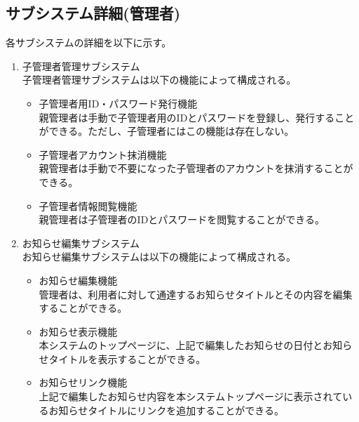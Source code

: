 \documentclass[a4j]{jarticle}
\begin{document}
\subsection{サブシステム詳細(管理者)}
各サブシステムの詳細を以下に示す。
\begin{enumerate}

  \item 子管理者管理サブシステム\\
  子管理者管理サブシステムは以下の機能によって構成される。
  \begin{itemize}
    \item 子管理者用ID・パスワード発行機能\\
    親管理者は手動で子管理者用のIDとパスワードを登録し、発行することができる。ただし、子管理者にはこの機能は存在しない。
    \item 子管理者アカウント抹消機能\\
    親管理者は手動で不要になった子管理者のアカウントを抹消することができる。
    \item 子管理者情報閲覧機能\\
    親管理者は子管理者のIDとパスワードを閲覧することができる。
  \end{itemize}


  \item お知らせ編集サブシステム\\
  お知らせ編集サブシステムは以下の機能によって構成される。
  \begin{itemize}
    \item お知らせ編集機能\\
    管理者は、利用者に対して通達するお知らせタイトルとその内容を編集することができる。
    \item お知らせ表示機能\\
    本システムのトップページに、上記で編集したお知らせの日付とお知らせタイトルを表示することができる。
    \item お知らせリンク機能\\
    上記で編集したお知らせ内容を本システムトップページに表示されているお知らせタイトルにリンクを追加することができる。\\
  \end{itemize}



\end{enumerate}
\end{document}
